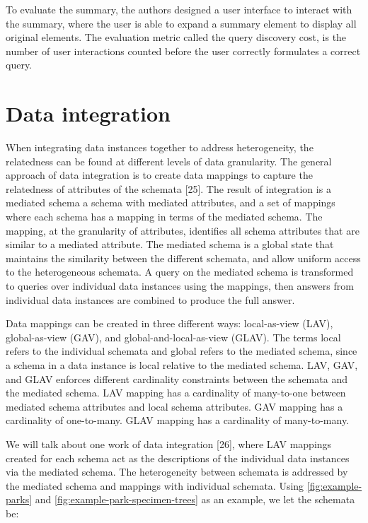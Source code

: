 To evaluate the summary, the authors designed a user interface to interact with the summary, where the user is able to expand a summary element to display all original elements. The evaluation metric called the query discovery cost, is the number of user interactions counted before the user correctly formulates a correct query.

\section{Data integration}
\label{sec:DataIntegration}

When integrating data instances together to address heterogeneity, the relatedness can be found at different levels of data granularity. The general approach of data integration is to create data mappings to capture the relatedness of attributes of the schemata \cite{Lenzerini2002Data}[25]. The result of integration is a mediated schema a schema with mediated attributes, and a set of mappings where each schema has a mapping in terms of the mediated schema. The mapping, at the granularity of attributes, identifies all schema attributes that are similar to a mediated attribute. The mediated schema is a global state that maintains the similarity between the different schemata, and allow uniform access to the heterogeneous schemata. A query on the mediated schema is transformed to queries over individual data instances using the mappings, then answers from individual data instances are combined to produce the full answer.

Data mappings can be created in three different ways: local-as-view (LAV), global-as-view (GAV), and global-and-local-as-view (GLAV). The terms local refers to the individual schemata and global refers to the mediated schema, since a schema in a data instance is local relative to the mediated schema. LAV, GAV, and GLAV enforces different cardinality constraints between the schemata and the mediated schema. LAV mapping has a cardinality of many-to-one between mediated schema attributes and local schema attributes. GAV mapping has a cardinality of one-to-many. GLAV mapping has a cardinality of many-to-many.

We will talk about one work of data integration \cite{Levy1996Querying}[26], where LAV mappings created for each schema act as the descriptions of the individual data instances via the mediated schema. The heterogeneity between schemata is addressed by the mediated schema and mappings with individual schemata. Using \autoref{fig:example-parks} and \autoref{fig:example-park-specimen-trees} as an example, we let the schemata be:

